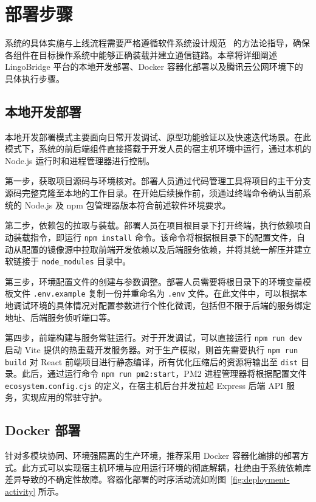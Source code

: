 \chapter{部署步骤}

系统的具体实施与上线流程需要严格遵循软件系统设计规范~\cite{ieee1016} 的方法论指导，确保各组件在目标操作系统中能够正确装载并建立通信链路。本章将详细阐述 LingoBridge 平台的本地开发部署、Docker 容器化部署以及腾讯云公网环境下的具体执行步骤。

\section{本地开发部署}

本地开发部署模式主要面向日常开发调试、原型功能验证以及快速迭代场景。在此模式下，系统的前后端组件直接搭载于开发人员的宿主机环境中运行，通过本机的 Node.js 运行时和进程管理器进行控制。

第一步，获取项目源码与环境核对。部署人员通过代码管理工具将项目的主干分支源码完整克隆至本地的工作目录。在开始后续操作前，须通过终端命令确认当前系统的 Node.js 及 npm 包管理器版本符合前述软件环境要求。

第二步，依赖包的拉取与装载。部署人员在项目根目录下打开终端，执行依赖项自动装载指令，即运行 \texttt{npm install} 命令。该命令将根据根目录下的配置文件，自动从配置的镜像源中拉取前端开发依赖以及后端服务依赖，并将其统一解压并建立软链接于 \texttt{node\_modules} 目录中。

第三步，环境配置文件的创建与参数调整。部署人员需要将根目录下的环境变量模板文件 \texttt{.env.example} 复制一份并重命名为 \texttt{.env} 文件。在此文件中，可以根据本地调试环境的具体情况对配置参数进行个性化微调，包括但不限于后端的服务绑定地址、后端服务侦听端口等。

第四步，前端构建与服务常驻运行。对于开发调试，可以直接运行 \texttt{npm run dev} 启动 Vite 提供的热重载开发服务器。对于生产模拟，则首先需要执行 \texttt{npm run build} 对 React 前端项目进行静态编译，所有优化压缩后的资源将输出至 \texttt{dist} 目录。此后，通过运行命令 \texttt{npm run pm2:start}，PM2 进程管理器将根据配置文件 \texttt{ecosystem.config.cjs} 的定义，在宿主机后台并发拉起 Express 后端 API 服务，实现应用的常驻守护。

\section{Docker 部署}

针对多模块协同、环境强隔离的生产环境，推荐采用 Docker 容器化编排的部署方式。此方式可以实现宿主机环境与应用运行环境的彻底解耦，杜绝由于系统依赖库差异导致的不确定性故障。容器化部署的时序活动流如附图~\ref{fig:deployment-activity} 所示。

